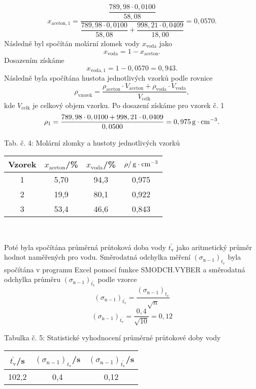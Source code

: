 \documentclass[12pt,a4paper]{article}
\def\ri#1{\mathrm{#1}}
\def\jd#1{\ifmmode\,\mathrm{#1}\else\,\textrm{#1}\fi}
\begin{document}
$$x_\ri{aceton, 1} = \dfrac{\dfrac{789,98 \cdot 0,0100}{58,08}}{\dfrac{789,98 \cdot 0,0100}{58,08}+\dfrac{998,21 \cdot 0,0409}{18,00}} = 0,0570.$$
Následně byl spočítán molární zlomek vody $x_\ri{voda}$ jako
\begin{equation}
x_\ri{voda} = 1-x_\ri{aceton}.
\end{equation}
Dosazením získáme
$$x_\ri{voda,1} = 1-0,0570 = 0,943.$$
Následně byla spočítána hustota jednotlivých vzorků podle rovnice
\begin{equation}
	\rho_\ri{vzorek} = \dfrac{\rho_\ri{aceton} \cdot V_\ri{aceton} + \rho_\ri{voda} \cdot V_\ri{voda}}{V_\ri{celk}},
\end{equation}
kde $V_\ri{celk}$ je celkový objem vzorku. Po dosazení získáme pro vzorek č. 1
$$\rho_\ri{1} = \dfrac{789,98 \cdot 0,0100 + 998,21 \cdot 0,0409}{0,0500} = 0,975\jd{g\cdot cm^\ri{-3}}.$$
\begin{center}
	\noindent Tab. č. 4: Molární zlomky a hustoty jednotlivých vzorků\\
	\begin{tabular}{c|c|c|c}
		Vzorek & $x_\ri{aceton}$/\% & $x_\ri{voda}$/\% & $\rho/\jd{g\cdot cm^\ri{-3}}$ \\
		\hline
		1 & 5,70 & 94,3 & 0,975\\
		2 & 19,9 & 80,1 & 0,922\\
		3 & 53,4 & 46,6 & 0,843\\
	\end{tabular}\\
\end{center}
Poté byla spočítána průměrná průtoková doba vody $\bar{t_\ri{v}}$ jako aritmetický průměr hodnot naměřených pro vodu. Směrodatná odchylka měření $(\sigma_\ri{n-1})_{t_\ri{v}}$ byla spočítána v programu Excel pomocí funkce SMODCH.VYBER a směrodatná odchylka průměru $(\sigma_\ri{n-1})_{\bar{t_\ri{v}}}$ podle vzorce
\begin{equation}
	(\sigma_\ri{n-1})_{\bar{t_\ri{v}}} = \dfrac{(\sigma_\ri{n-1})_{t_\ri{v}}}{\sqrt{n}}
\end{equation}
$$(\sigma_\ri{n-1})_{\bar{t_\ri{v}}} = \dfrac{0,4}{\sqrt{10}}=0,12$$
\begin{center}
	\noindent Tabulka č. 5: Statistické vyhodnocení průměrné průtokové doby vody
	\begin{tabular}{c|c|c}
		$\bar{t_\ri{v}}$/s & $(\sigma_\ri{n-1})_{t_\ri{v}}$/s & $(\sigma_\ri{n-1})_{\bar{t_\ri{v}}}$/s\\
		\hline
		102,2 & 0,4 & 0,12 \\
	\end{tabular}\\
\end{center}
\end{document}
